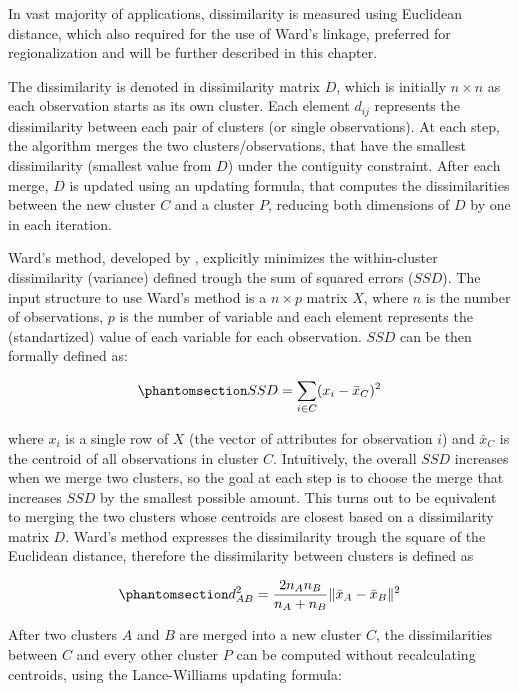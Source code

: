 \documentclass[
  english,
  12pt,
  a4paper,
]{article}
\begin{document}
In vast majority of applications, dissimilarity is measured using
Euclidean distance, which also required for the use of Ward's linkage,
preferred for regionalization and will be further described in this
chapter.

The dissimilarity is denoted in dissimilarity matrix \(D\), which is
initially \(n \times n\) as each observation starts as its own cluster.
Each element \(d_{ij}\) represents the dissimilarity between each pair
of clusters (or single observations). At each step, the algorithm merges
the two clusters/observations, that have the smallest dissimilarity
(smallest value from \(D\)) under the contiguity constraint. After each
merge, \(D\) is updated using an updating formula, that computes the
dissimilarities between the new cluster \(C\) and a cluster \(P\),
reducing both dimensions of \(D\) by one in each iteration.

Ward's method, developed by \citet{ward1963}, explicitly minimizes the
within-cluster dissimilarity (variance) defined trough the sum of
squared errors (\(SSD\)). The input structure to use Ward's method is a
\(n \times p\) matrix \(X\), where \(n\) is the number of observations,
\(p\) is the number of variable and each element represents the
(standartized) value of each variable for each observation. \(SSD\) can
be then formally defined as:

\begin{equation}\phantomsection\label{eq-ssd}{SSD = \sum_{i \in C} (x_i - \bar{x}_C)^2}\end{equation}

where \(x_i\) is a single row of \(X\) (the vector of attributes for
observation \(i\)) and \(\bar{x}_C\) is the centroid of all observations
in cluster \(C\). Intuitively, the overall \(SSD\) increases when we
merge two clusters, so the goal at each step is to choose the merge that
increases \(SSD\) by the smallest possible amount. This turns out to be
equivalent to merging the two clusters whose centroids are closest based
on a dissimilarity matrix \(D\). Ward's method expresses the
dissimilarity trough the square of the Euclidean distance, therefore the
dissimilarity between clusters is defined as

\begin{equation}\phantomsection\label{eq-dissimilarity}{d^2_{AB} = \frac{2n_A n_B}{n_A + n_B} \| \bar{x}_A - \bar{x}_B \|^2}\end{equation}

After two clusters \(A\) and \(B\) are merged into a new cluster \(C\),
the dissimilarities between \(C\) and every other cluster \(P\) can be
computed without recalculating centroids, using the Lance-Williams
updating formula:
\end{document}
